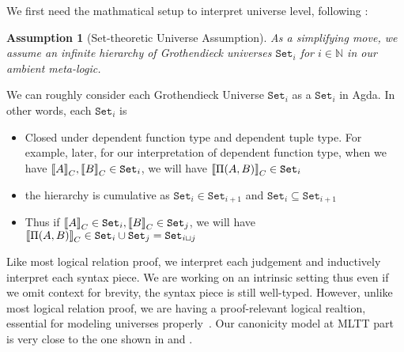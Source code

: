We first need the mathmatical setup to interpret universe level, following \citet{sterling2019algebraic}:

\newcommand{\Set}[1]{\ensuremath{\texttt{Set}_{#1}}}
\newtheorem{assumption}{Assumption}[section]

\begin{assumption}[Set-theoretic Universe Assumption] As a simplifying move, we assume an infinite hierarchy of Grothendieck universes $\Set{i}$ for $i \in \mathbb{N}$ in our ambient meta-logic.
\end{assumption}

We can roughly consider each Grothendieck Universe $\Set{i}$ as a $\Set{i}$ in Agda. In other words, each $\Set{i}$ is 
\begin{itemize}
  \item Closed under dependent function type and dependent tuple type. For example, later, for our interpretation of dependent function type, when we have $\denotesC{A}, \denotesC{B} \in \Set{i}$, we will have $\denotesC{\TyPi{A}{B}} \in \Set{i}$
  \item the hierarchy is cumulative as $\Set{i} \in \Set{i+1}$ and $\Set{i} \subseteq \Set{i+1}$
  \item Thus if $\denotesC{A} \in \Set{i}, \denotesC{B} \in \Set{j}$, we will have $\denotesC{\TyPi{A}{B}} \in \Set{i} \cup \Set{j} = \Set{i \lcup j}$
\end{itemize}


Like most logical relation proof,  we interpret each judgement and inductively interpret each syntax piece. We are working on an intrinsic setting thus even if we omit context for brevity, the syntax piece is still well-typed. However, unlike most logical relation proof, we are having a proof-relevant logical realtion, essential for modeling universes properly~\cite{coquand2018canonicity}. Our canonicity model at MLTT part is very close to the one shown in \citet{coquand2018canonicity} and \citet{sterling2019algebraic}.

